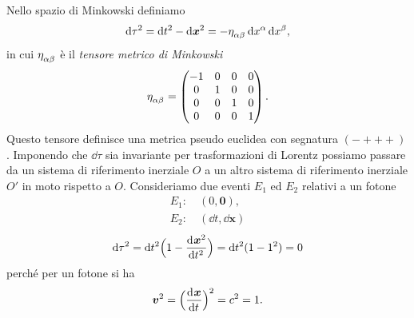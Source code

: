 Nello spazio di Minkowski definiamo
\begin{equation}
  \dd \tau^{2} = \dd t^{2} - \dd \bm{x}^{2} = -\tensor{\eta}{_{\alpha\beta}}\dd
  x^{\alpha} \dd x^{\beta},
\end{equation}
in cui $\tensor{\eta}{_{\alpha\beta}}$ è il \emph{tensore metrico di Minkowski}
\begin{equation}
  \tensor{\eta}{_{\alpha\beta}} =
  \begin{pmatrix}
    -1 & 0 & 0 & 0 \\
    0 & 1 & 0 & 0 \\
    0 & 0 & 1 & 0 \\
    0 & 0 & 0 & 1
  \end{pmatrix}.
\end{equation}
Questo tensore definisce una metrica pseudo euclidea con segnatura $(-+++)$.
Imponendo che $\dd \tau$ sia invariante per trasformazioni di Lorentz possiamo
passare da un sistema di riferimento inerziale $O$ a un altro sistema di
riferimento inerziale $O'$ in moto rispetto a $O$.  Consideriamo due eventi
$E_{1}$ ed $E_{2}$ relativi a un fotone
\begin{gather}
  E_{1}: \quad (0,\bm{0}), \\
  E_{2}: \quad (\dd t, \dd \bm{x})
\end{gather}
\begin{equation}
  \mathop{}\!\mathrm{d} \tau^{2} = \mathop{}\!\mathrm{d} t^{2}\Big( 1 - \frac{{\mathop{}\!\mathrm{d}^{}}\bm{x}^{2}}{\mathop{}\!\mathrm{d} {t^{2}}^{}}\Big) = \mathop{}\!\mathrm{d} t^{2}
  (1 - 1^{2}) = 0
\end{equation}
perché per un fotone si ha
\begin{equation}
  \bm{v}^{2} = \Big(\frac{{\mathop{}\!\mathrm{d}^{}}\bm{x}}{\mathop{}\!\mathrm{d} {t}^{}}\Big)^{2} = c^{2} = 1.
\end{equation}


